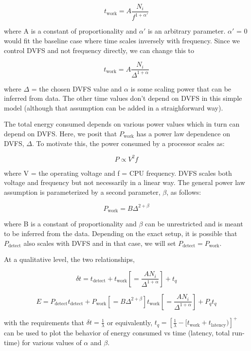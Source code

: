 $$t_{\text{work}} = A\frac{N_i}{f^{1+\alpha'}}$$

where A is a constant of proportionality and $\alpha'$ is an arbitrary parameter. $\alpha'$ = 0 would fit the baseline case where time scales inversely with frequency. Since we control DVFS and not frequency directly, we can change this to

$$t_{\text{work}} = A\frac{N_i}{\Delta^{1+\alpha}}$$

where $\Delta$ = the chosen DVFS value and $\alpha$ is some scaling power that can be inferred from data. The other time values don't depend on DVFS in this simple model (although that assumption can be added in a straighforward way).

The total energy consumed depends on various power values which in turn can depend on DVFS. Here, we posit that $P_{\text{work}}$ has a power law dependence on DVFS, $\Delta$. To motivate this, the power consumed by a processor scales as:

$$P \propto V^2 f$$

where V = the operating voltage and f = CPU frequency. DVFS scales both voltage and frequency but not necessarily in a linear way. The general power law assumption is parameterized by a second parameter, $\beta$, as follows:

$$P_{\text{work}} = B \Delta^{2+\beta}$$

where B is a constant of proportionality and $\beta$ can be unrestricted and is meant to be inferred from the data. Depending on the exact setup, it is possible that $P_{\text{detect}}$ also scales with DVFS and in that case, we will set $P_{\text{detect}} = P_{\text{work}}$.

At a qualitative level, the two relationships,

\begin{equation}
    \delta t = t_{\text{detect}} + t_{\text{work}} [=\frac{AN_i}{\Delta^{1+\alpha}}] + t_q
\end{equation}

\begin{equation}
    E = P_\text{detect} t_{\text{detect}} + P_{\text{work}}[=B\Delta^{2+\beta}] t_{\text{work}}[=\frac{AN_i}{\Delta^{1+\alpha}}] + P_q t_q
\end{equation}

with the requirements that $\delta t = \frac{1}{\lambda}$ or equivalently, $t_q = \left[\frac{1}{\lambda} - [t_\text{work}+t_\text{latency}) \right]^+$ can be used to plot the behavior of energy consumed vs time (latency, total run-time) for various values of $\alpha$ and $\beta$.

